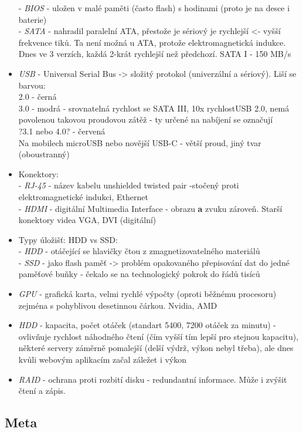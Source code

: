 \documentclass[12pt]{article}
\begin{document}
\begin{itemize}
 - \emph{BIOS} - uložen v malé paměti (často flash) s hodinami (proto je na desce i baterie)\\
 - \emph{SATA} - nahradil paralelní ATA, přestože je sériový je rychlejší <- vyšší frekvence tiků. Ta není možná u ATA, protože elektromagnetická indukce. Dnes ve 3 verzích, každá 2-krát rychlejší než předchozí. SATA I - 150 MB/s\\
 \item \emph{USB} - Universal Serial Bus -> složitý protokol (univerzální a sériový). Liší se barvou:\\2.0 - černá\\3.0 - modrá - srovnatelná rychlost se SATA III, 10x rychlostUSB 2.0, nemá povolenou takovou proudovou zátěž - ty určené na nabíjení se označují \\?3.1 nebo 4.0? - červená\\
Na mobilech microUSB nebo novější USB-C - větší proud, jiný tvar (oboustranný)
\item Konektory:\\
 - \emph{RJ-45} - název kabelu unshielded twisted pair -stočený proti elektromagnetické indukci, Ethernet\\
 - \emph{HDMI} - digitální Multimedia Interface - obrazu \textbf{a} zvuku zároveň. Starší konektory videa VGA, DVI (digitální)
\item Typy úložišť: HDD vs SSD:\\
 - \emph{HDD} - otáčející se hlavičky čtou z zmagnetizovatelného materiálů\\
 - \emph{SSD} - jako flash paměť -> problém opakovaného přepisování dat do jedné paměťové buňky - čekalo se na technologický pokrok do řádů tisíců\\
\item \emph{GPU} - grafická karta, velmi rychlé výpočty (oproti běžnému procesoru) zejména s pohyblivou desetinnou čárkou. Nvidia, AMD
\item \emph{HDD} - kapacita, počet otáček (standart 5400, 7200 otáček za minutu) - ovlivňuje rychlost náhodného čtení (čím vyšší tím lepší pro stejnou kapacitu), některé servery záměrně pomalejší (delší výdrž, výkon nebyl třeba), ale dnes kvůli webovým aplikacím začal záležet i výkon
\item \emph{RAID} - ochrana proti rozbití disku - redundantní informace. Může i zvýšit čtení a zápis. 
\end{itemize} 

\subsection{Meta}
\end{document}
